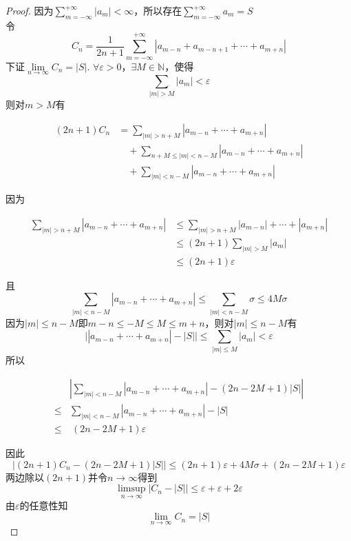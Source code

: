 \begin{proof}

    因为$\sum\limits_{m = -\infty}^{+\infty}{|a_m|} < \infty$，所以存在$\sum\limits_{m = -\infty}^{+\infty}{a_m} = S$ \\
    令
    $$C_n = \dfrac{1}{2n + 1}\sum\limits_{m = -\infty}^{+\infty}{|a_{m - n} + a_{m - n + 1} + \cdots + a_{m + n}|}$$
    下证$\lim\limits_{n \to \infty}{C_n} = |S|$. $\forall \varepsilon > 0$，$\exists M \in \mathbb{N}$，使得
    $$\sum\limits_{|m| > M}{|a_m|} < \varepsilon$$
    则对$m > M$有

    \begin{align*}
        (2n + 1)C_n & = \sum\limits_{|m| > n + M}{|a_{m - n} + \cdots + a_{m + n}|} \\
        & \quad + \sum\limits_{n + M \leq |m| < n - M}{|a_{m - n} + \cdots + a_{m + n}|} \\
        & \quad + \sum\limits_{|m| < n - M}{|a_{m - n} + \cdots + a_{m + n}|}
    \end{align*}

    因为

    \begin{align*}
        \sum\limits_{|m| > n + M}{|a_{m - n} + \cdots + a_{m + n}|} & \leq \sum\limits_{|m| > n + M}{|a_{m - n}| + \cdots + |a_{m + n}|} \\
        & \leq (2n + 1)\sum\limits_{|m| > M}{|a_m|} \\
        & \leq (2n + 1)\varepsilon
    \end{align*}

    且
    $$\sum\limits_{|m| < n - M}{|a_{m - n} + \cdots + a_{m + n}|} \leq \sum\limits_{|m| < n - M}{\sigma} \leq 4M\sigma$$
    因为$|m| \leq n - M$即$m - n \leq -M \leq M \leq m + n$，则对$|m| \leq n - M$有
    $$\Big| |a_{m - n} + \cdots + a_{m + n}| - |S| \Big| \leq \sum\limits_{|m| \leq M}{|a_m|} < \varepsilon$$
    所以

    \begin{align*}
        & \left| \sum\limits_{|m| < n - M}{|a_{m - n} + \cdots + a_{m + n}|} - (2n - 2M + 1)|S| \right| \\
        \leq & \sum\limits_{|m| < n - M}{|a_{m - n} + \cdots + a_{m + n}| - |S|} \\
        \leq & \ (2n - 2M + 1)\varepsilon        
    \end{align*}

    因此
    $$\Big| (2n + 1)C_n - (2n - 2M + 1)|S| \Big| \leq (2n + 1)\varepsilon + 4M\sigma + (2n - 2M + 1)\varepsilon$$
    两边除以$(2n + 1)$并令$n \to \infty$得到
    $$\limsup\limits_{n \to \infty}{\Big|C_n - |S|\Big|} \leq \varepsilon + \varepsilon + 2\varepsilon$$
    由$\varepsilon$的任意性知
    $$\lim\limits_{n \to \infty}{C_n} = |S|$$

\end{proof}

